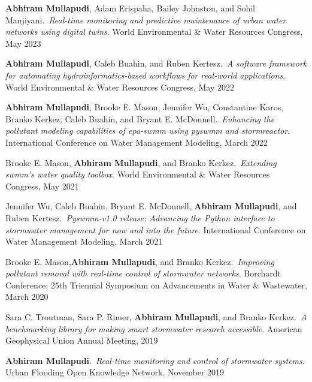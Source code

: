 \documentclass[a4paper,11pt]{article}
\newcommand{\years}[1]{%
  {\reversemarginpar\strut\marginnote{{\small#1}}}%
}
\begin{document}
\years{2023} \textbf{Abhiram Mullapudi}, Adam Erispaha, Bailey Johnston, and Sohil Manjiyani.\ \emph{Real-time monitoring and predictive maintenance of urban water networks using digital twins}. World Environmental \& Water Resources Congress, May 2023\\[.1cm]

\years{2022} \textbf{Abhiram Mullapudi}, Caleb Buahin, and Ruben Kertesz.\ \emph{A software framework for automating hydroinformatics-based workflows for real-world applications}. World Environmental \& Water Resources Congress, May 2022\\[.1cm]

\years{2022} \textbf{Abhiram Mullapudi}, Brooke E. Mason, Jennifer Wu, Constantine Karos, Branko
Kerkez, Caleb Buahin, and Bryant E. McDonnell.\ \emph{Enhancing the pollutant modeling capabilities of epa-swmm using pyswmm and stormreactor}. International Conference on Water Management Modeling, March 2022\\[.1cm]

\years{2021} Brooke E. Mason, \textbf{Abhiram Mullapudi}, and Branko Kerkez.\ \emph{Extending swmm’s water quality toolbox}. World Environmental \& Water Resources Congress, May 2021\\[.1cm]

\years{2021} Jennifer Wu, Caleb Buahin, Bryant E. McDonnell, \textbf{Abhiram Mullapudi}, and Ruben Kertesz.\ \emph{Pyswmm-v1.0 release: Advancing the Python interface to stormwater management for now and into the future}. International Conference on Water Management Modeling, March 2021\\[.1cm]

\years{2020} Brooke E. Mason,\textbf{Abhiram Mullapudi}, and Branko Kerkez.\ \emph{Improving pollutant removal with real-time control of stormwater networks}. Borchardt Conference: 25th Triennial Symposium on Advancements in Water \& Wastewater, March 2020\\[.1cm]

\years{2019} Sara C. Troutman, Sara P. Rimer, \textbf{Abhiram Mullapudi}, and Branko Kerkez.\ \emph{A benchmarking library for making smart stormwater research accessible}. American Geophysical Union Annual Meeting, 2019\\[.1cm]

\years{2019} \textbf{Abhiram Mullapudi}.\ \emph{Real-time monitoring and control of stormwater systems}. Urban Flooding Open Knowledge Network, November 2019\\[.1cm]
\end{document}

